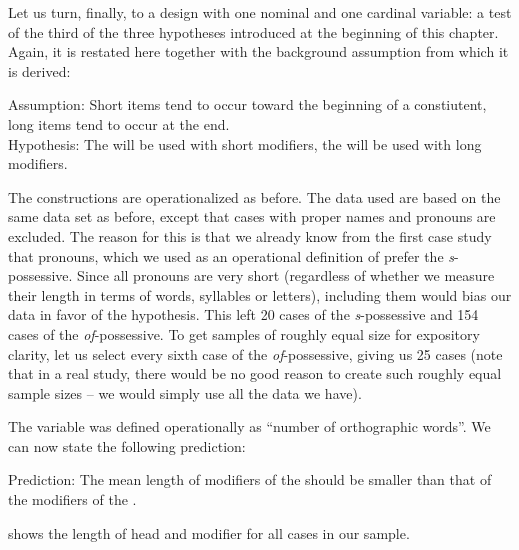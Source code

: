 Let us turn, finally, to a design  with one nominal  and one cardinal  variable: a test of the third of the three hypotheses  introduced at the beginning of this chapter. Again, it is restated here together with the background assumption from which it is derived:

\begin{exe}
\ex Assumption: Short items tend to occur toward the beginning of a constiutent, long items tend to occur at the end. \\[1.5ex]
Hypothesis:  The   will be used with short modifiers, the  will be used with long modifiers.
\label{ex:lengthhypothesis}
\end{exe}

The constructions are operationalized  as before. The data used are based on the same data set as before, except that cases with proper names and pronouns  are excluded. The reason for this is that we already know from the first case study that pronouns, which we used as an operational definition of  prefer the \textit{s}-possessive.  Since all pronouns are very short (regardless of whether we measure  their length  in terms of words, syllables  or letters), including them would bias our data in favor of the hypothesis.  This left 20 cases of the \textit{s}-possessive and 154 cases of the \textit{of}-possessive. To get samples  of roughly equal size  for expository clarity, let us select every sixth case of the \textit{of}-possessive,  giving us 25 cases (note that in a real study, there would be no good reason to create such roughly equal sample sizes  -- we would simply use all the data we have).

The variable   was defined operationally  as ``number of orthographic words''. We can now state the following prediction:

\begin{exe}
\ex Prediction: The mean length of modifiers of the  should be smaller than that of the modifiers of the .
\label{ex:lengthprediction}
\end{exe}

 shows the length of head and modifier for all cases in our sample.

